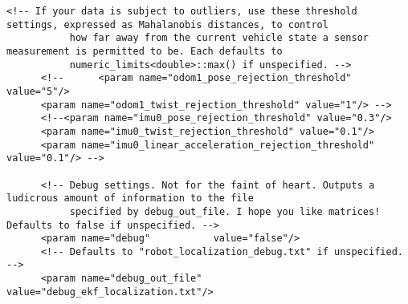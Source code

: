 \begin{lstlisting}[breaklines=true,basicstyle=\tiny]
      <!-- If your data is subject to outliers, use these threshold settings, expressed as Mahalanobis distances, to control
           how far away from the current vehicle state a sensor measurement is permitted to be. Each defaults to
           numeric_limits<double>::max() if unspecified. -->
      <!--      <param name="odom1_pose_rejection_threshold" value="5"/>
      <param name="odom1_twist_rejection_threshold" value="1"/> -->
      <!--<param name="imu0_pose_rejection_threshold" value="0.3"/>
      <param name="imu0_twist_rejection_threshold" value="0.1"/>
      <param name="imu0_linear_acceleration_rejection_threshold" value="0.1"/> -->

      <!-- Debug settings. Not for the faint of heart. Outputs a ludicrous amount of information to the file
           specified by debug_out_file. I hope you like matrices! Defaults to false if unspecified. -->
      <param name="debug"           value="false"/>
      <!-- Defaults to "robot_localization_debug.txt" if unspecified. -->
      <param name="debug_out_file"  value="debug_ekf_localization.txt"/>


\end{lstlisting}
